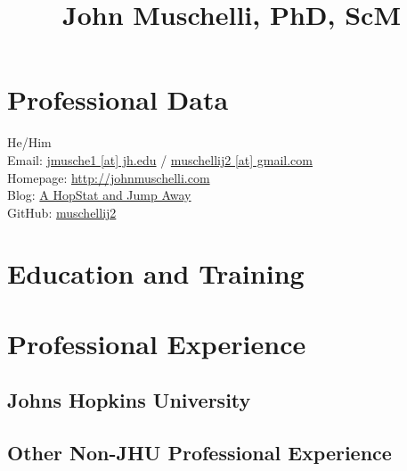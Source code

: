 \documentclass[11pt,a4paper]{moderncv}
\title{John Muschelli, PhD, ScM}
\begin{document}
 


\maketitle
\vspace{-3em}

\section{Professional Data}

He/Him \\
Email: \href{mailto:jmusche1@jh.edu}{jmusche1 [at] jh.edu} /  \href{mailto:muschellij2@gmail.com}{muschellij2 [at] gmail.com} \\                      %
Homepage: \href{http://johnmuschelli.com}{http://johnmuschelli.com}\\
Blog: \href{https://hopstat.wordpress.com/}{A HopStat and Jump Away} \\ %
GitHub: \href{https://github.com/muschellij2}{muschellij2} \\


\section{Education and Training}



\section{Professional Experience}
\subsection{Johns Hopkins University}



\subsection{Other Non-JHU Professional Experience}
\vspace{1em}
\end{document}
